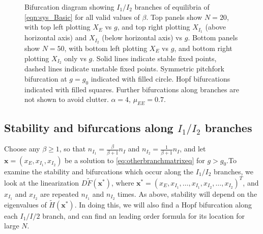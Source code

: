 \documentclass[11pt,reqno]{amsart}
\newcommand{\xvec}{\mathbf{x}}
\begin{document}
\begin{figure}
\begin{tabular}{cc}
    \end{tabular}
    \caption{Bifurcation diagram showing $I_1/I_2$ branches of equilibria of \cref{eqn:sys_Basic} for all valid values of $\beta$. Top panels show $N=20$, with top left plotting $X_E$ vs $g$, and top right plotting $X_{I_1}$ (above horizontal axis) and $X_{I_2}$ (below horizontal axis) vs $g$. Bottom panels show $N=50$, with bottom left plotting $X_E$ vs $g$, and bottom right plotting $X_{I_2}$ only vs $g$. Solid lines indicate stable fixed points, dashed lines indicate unstable fixed points. Symmetric pitchfork bifurcation at $g = g_0$ indicated with filled circle. Hopf bifurcations indicated with filled squares. Further bifurcations along branches are not shown to avoid clutter. $\alpha = 4$, $\mu_{EE} = 0.7$.}
    \label{fig:noclusterBD1}
\end{figure}

\subsection{Stability and bifurcations along $I_1/I_2$ branches}

Choose any $\beta \geq 1$, so that $n_{I_1} = \frac{\beta}{\beta+1}n_I$ and $n_{I_2} = \frac{1}{\beta+1}n_I$, and let $\xvec = (x_E, x_{I_1}, x_{I_2})$ be a solution to \cref{eq:otherbranchmatrixeq} for $g > g_0$.To examine the stability and bifurcations which occur along the $I_1/I_2$ branches, we look at the linearization $D\tilde{F}(\xvec^*)$, where $\xvec^* = (x_E, x_{I_1}, \dots, x_{I_1}, x_{I_2}, \dots, x_{I_2})^T$, and $x_{I_1}$ and $x_{I_2}$ are repeated $n_{I_1}$ and $n_{I_2}$ times. As above, stability will depend on the eigenvalues of $\tilde{H}(\xvec^*)$. In doing this, we will also find a Hopf bifurcation along each $I_1/I/2$ branch, and can find an leading order formula for its location for large $N$.
\end{document}
